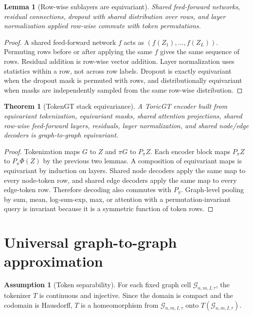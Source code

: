 \documentclass[11pt]{article}
\theoremstyle{definition}
\newtheorem{assumption}[definition]{Assumption}
\theoremstyle{plain}
\newtheorem{theorem}[definition]{Theorem}
\newtheorem{lemma}[definition]{Lemma}
\theoremstyle{remark}
\numberwithin{equation}{section}
\newcommand{\G}{\mathcal{G}}
\begin{document}
\begin{lemma}[Row-wise sublayers are equivariant]
Shared feed-forward networks, residual connections, dropout with shared distribution over rows, and layer normalization applied row-wise commute with token permutations.
\end{lemma}

\begin{proof}
A shared feed-forward network $f$ acts as $(f(Z_1),\ldots,f(Z_L))$.  Permuting rows before or after applying the same $f$ gives the same sequence of rows.  Residual addition is row-wise vector addition.  Layer normalization uses statistics within a row, not across row labels.  Dropout is exactly equivariant when the dropout mask is permuted with rows, and distributionally equivariant when masks are independently sampled from the same row-wise distribution.
\end{proof}

\begin{theorem}[TokenGT stack equivariance]
A ToricGT encoder built from equivariant tokenization, equivariant masks, shared attention projections, shared row-wise feed-forward layers, residuals, layer normalization, and shared node/edge decoders is graph-to-graph equivariant.
\end{theorem}

\begin{proof}
Tokenization maps $G$ to $Z$ and $\pi G$ to $P_\pi Z$.  Each encoder block maps $P_\pi Z$ to $P_\pi \Phi(Z)$ by the previous two lemmas.  A composition of equivariant maps is equivariant by induction on layers.  Shared node decoders apply the same map to every node-token row, and shared edge decoders apply the same map to every edge-token row.  Therefore decoding also commutes with $P_\pi$.  Graph-level pooling by sum, mean, log-sum-exp, max, or attention with a permutation-invariant query is invariant because it is a symmetric function of token rows.
\end{proof}

\section{Universal graph-to-graph approximation}

\begin{assumption}[Token separability]
For each fixed graph cell $\G_{n,m,I,\tau}$, the tokenizer $T$ is continuous and injective.  Since the domain is compact and the codomain is Hausdorff, $T$ is a homeomorphism from $\G_{n,m,I,\tau}$ onto $T(\G_{n,m,I,\tau})$.
\end{assumption}
\end{document}
